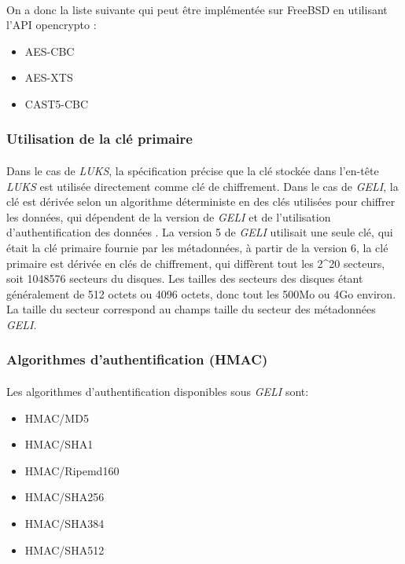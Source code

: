 \paragraph{}
On a donc la liste suivante qui peut être implémentée sur FreeBSD en utilisant 
l'API opencrypto :
\begin{itemize}
	\item{AES-CBC}
	\item{AES-XTS}
	\item{CAST5-CBC}
\end{itemize}


\subsubsection{Utilisation de la clé primaire}
\paragraph{}
Dans le cas de {\em LUKS}, la spécification \cite{onDiskFormatLuks} précise 
que la clé stockée dans l'en-tête {\em LUKS} est utilisée directement comme 
clé de chiffrement. Dans le cas de {\em GELI}, la clé est dérivée selon un 
algorithme déterministe en des clés utilisées pour chiffrer les données, 
qui dépendent de la version de {\em GELI} et de l'utilisation 
d'authentification des données \cite{manGeli}. 
La version 5 de {\em GELI} utilisait une seule clé, qui était la clé
primaire fournie par les métadonnées, à partir de la version 6, la clé primaire
est dérivée en clés de chiffrement, qui diffèrent tout les 2\textasciicircum20 
secteurs, soit 1048576 secteurs du disques. Les tailles des secteurs des 
disques étant généralement de 512 octets ou 4096 octets, 
donc tout les 500Mo ou 4Go environ.
La taille du secteur correspond au champs taille du secteur des métadonnées
{\em GELI}.

\subsubsection{Algorithmes d'authentification (HMAC)}
\paragraph{}
Les algorithmes d'authentification disponibles sous {\em GELI} sont:
\begin{itemize}
	\item HMAC/MD5
	\item HMAC/SHA1
	\item HMAC/Ripemd160
	\item HMAC/SHA256
	\item HMAC/SHA384
	\item HMAC/SHA512
\end{itemize}

